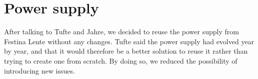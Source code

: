 \section {Power supply}

After talking to Tufte and Jahre, we decided to reuse the power supply
from Festina Lente without any changes. Tufte said the power supply had evolved year by
year, and that it would therefore be a better solution to reuse it rather
than trying to create one from scratch. By doing so, we reduced the possibility 
of introducing new issues.
